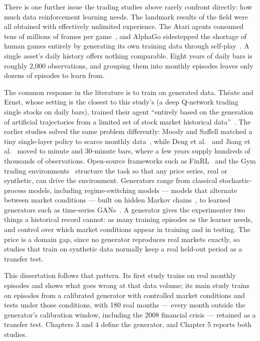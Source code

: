 There is one further issue the trading studies above rarely confront
directly: how much data reinforcement learning needs. The landmark
results of the field were all obtained with effectively unlimited
experience. The Atari agents consumed tens of millions of frames per
game~\cite{mnih2015}, and AlphaGo sidestepped the shortage of human
games entirely by generating its own training data through
self-play~\cite{silver2016}. A single asset's daily history offers
nothing comparable. Eight years of daily bars is roughly 2,000
observations, and grouping them into monthly episodes leaves only
dozens of episodes to learn from.

The common response in the literature is to train on generated data.
Théate and Ernst, whose setting is the closest to this study's (a deep
Q-network trading single stocks on daily bars), trained their agent
``entirely based on the generation of artificial trajectories from a
limited set of stock market historical data''~\cite{theate2021}. The
earlier studies solved the same problem differently: Moody and Saffell
matched a tiny single-layer policy to scarce monthly data~\cite{moody2001},
while Deng et al.~\cite{deng2017} and Jiang et al.~\cite{jiang2017} moved
to minute and 30-minute bars, where a few years supply hundreds of
thousands of observations. Open-source frameworks such as
FinRL~\cite{liu2020finrl} and the Gym trading
environments~\cite{brockman2016gym} structure the task so that any price
series, real or synthetic, can drive the environment. Generators range
from classical stochastic-process models, including regime-switching
models --- models that alternate between market conditions --- built on
hidden Markov chains~\cite{rabiner1989}, to learned generators such as
time-series GANs~\cite{yoon2019timegan}.
A generator gives the experimenter two things a historical record
cannot: as many training episodes as the learner needs, and control
over which market conditions appear in training and in testing. The
price is a domain gap, since no generator reproduces real markets
exactly, so studies that train on synthetic data normally keep a real
held-out period as a transfer test.

This dissertation follows that pattern. Its first study trains on real
monthly episodes and shows what goes wrong at that data volume; its main
study trains on episodes from a calibrated generator with controlled
market conditions and tests under those conditions, with 180 real months --- every
month outside the generator's calibration window, including the 2008
financial crisis --- retained as a transfer test. Chapters 3 and 4
define the generator, and Chapter 5 reports both studies.

